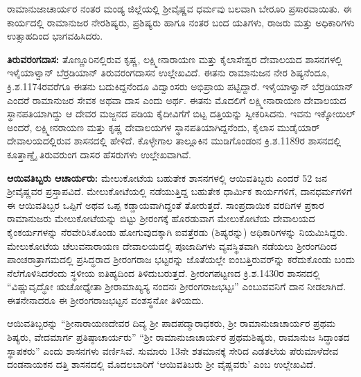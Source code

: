 ರಾಮಾನುಜಾಚಾರ್ಯರ ನಂತರ ಮಂಡ್ಯ ಜಿಲ್ಲೆಯಲ್ಲಿ ಶ‍್ರೀವೈಷ್ಣವ ಧರ್ಮವು ಬಲವಾಗಿ ಬೇರೂರಿ ಪ್ರಸಾರವಾಯಿತು. ಈ ಕಾರ್ಯದಲ್ಲಿ ರಾಮಾನುಜರ ನೇರಶಿಷ್ಯರು, ಪ್ರಶಿಷ್ಯರು ಹಾಗೂ ನಂತರ ಬಂದ ಯತಿಗಳು, ರಾಜರು ಮತ್ತು ಅಧಿಕಾರಿಗಳು ಉತ್ಸಾಹದಿಂದ ಭಾಗವಹಿಸಿದರು.

\textbf{ತಿರುವರಂಗದಾಸ:} ತೊಣ್ಣೂರಿನಲ್ಲಿರುವ ಕೃಷ್ಣ, ಲಕ್ಷ್ಮೀನಾರಾಯಣ ಮತ್ತು ಕೈಲಾಸೇಶ್ವರ ದೇವಾಲಯದ ಶಾಸನಗಳಲ್ಲಿ ಇಳೈಯಾಳ್ವಾನ್​ ಬೆರ್ರಡಿಯಾನ್​ ತಿರುವರಂಗದಾಸನ ಉಲ್ಲೇಖವಿದೆ. ಈತನು ರಾಮಾನುಜನ ನೇರ ಶಿಷ್ಯನೆಂದೂ, ಕ್ರಿ.ಶ.1174ರವರೆಗೂ ಈತನು ಬದುಕಿದ್ದನೆಂದೂ ವಿದ್ವಾಂಸರು ಅಭಿಪ್ರಾಯ ಪಟ್ಟಿದ್ದಾರೆ. ಇಳೈಯಾಳ್ವಾನ್​ ಬೆರ್ರಡಿಯಾನ್​ ಎಂದರೆ ರಾಮಾನುಜರ ಸೇವಕ ಅಥವಾ ದಾಸ ಎಂದು ಅರ್ಥ. ಈತನು ಮೊದಲಿಗೆ ಲಕ್ಷ್ಮೀನಾರಾಯಣ ದೇವಾಲಯದ ಸ್ಥಾನಪತಿಯಾಗಿದ್ದು ಆ ದೇವರ ಮಜ್ಜನದ ಪಡಿಯ ಕೈದೀವಿಗೆಗೆ ಬಿಟ್ಟ ದತ್ತಿಯನ್ನು ಸ್ವೀಕರಿಸಿದನು. ಇವನು ಇಕ್ಕೋಯಿಲ್​ ಅಂದರೆ, ಲಕ್ಷ್ಮೀನರಾಯಣ ಮತ್ತು ಕೃಷ್ಣ ದೇವಾಲಯಗಳ ಸ್ಥಾನಪತಿಯಾಗಿದ್ದನೆಂದು, ಕೈಲಾಸ ಮುಡೈಯಾರ್​ ದೇವಾಲಯದಲ್ಲಿರುವ ಶಾಸನದಲ್ಲಿ ಹೇಳಿದೆ. ಕೊಳ್ಳೇಗಾಲ ತಾಲ್ಲೂಕಿನ ಮುಡಿಗೊಂಡಂನ ಕ್ರಿ.ಶ.1189ರ ಶಾಸನದಲ್ಲಿ ಕೂತ್ತಾಣ್ಡೈ ತಿರುವರುಂಗ ದಾಸರ ಹೆಸರುಗಳು ಉಲ್ಲೇಖವಾಗಿವೆ.

\textbf{ಆಯಿವತಿಬ್ಬರು ಆಚಾರ್ಯರು:} ಮೇಲುಕೋಟೆಯ ಬಹುತೇಕ ಶಾಸನಗಳಲ್ಲಿ ಆಯಿವತಿಬ್ಬರು ಎಂದರೆ 52 ಜನ ಶ‍್ರೀವೈಷ್ಣವರ ಪ್ರಸ್ತಾಪವಿದೆ. ಮೇಲುಕೋಟೆಯಲ್ಲಿ ನಡೆಯುತ್ತಿದ್ದ ಬಹುತೇಕ ಧಾರ್ಮಿಕ ಕಾರ್ಯಗಳಿಗೆ, ದಾನಧರ್ಮಗಳಿಗೆ ಈ ಆಯಿವತಿಬ್ಬರ ಒಪ್ಪಿಗೆ ಅಥವ ಒಪ್ಪ ಕಡ್ಡಾಯವಾಗಿದ್ದಂತೆ ತೋರುತ್ತದೆ. ಸಾಂಪ್ರದಾಯಿಕ ವರದಿಗಳ ಪ್ರಕಾರ ರಾಮಾನುಜರು ಮೇಲುಕೋಟೆಯನ್ನು ಬಿಟ್ಟು ಶ‍್ರೀರಂಗಕ್ಕೆ ಹೊರಡುವಾಗ ಮೇಲುಕೋಟೆಯ ದೇವಾಲಯದ ಕೈಂಕರ್ಯಗಳನ್ನು ನೆರವೇರಿಸಿಕೊಂಡು ಹೋಗುವುದಕ್ಕಾಗಿ ಐವತ್ತೆರಡು (ಶಿಷ್ಯರನ್ನು) ಅಧಿಕಾರಿಗಳನ್ನು ನಿಯಮಿಸಿದ್ದರು. ಮೇಲುಕೋಟೆಯ ಚೆಲುವನಾರಾಯಣ ದೇವಾಲಯದಲ್ಲಿ ಪೂಜಾದಿಗಳು ವ್ಯವಸ್ಥಿತವಾಗಿ ನಡೆಯಲು ಶ‍್ರೀರಂಗದಿಂದ ಪಾಂಚರಾತ್ರಾಗಮದಲ್ಲಿ ಪ್ರಸಿದ್ಧರಾದ ಶ‍್ರೀರಂಗರಾಜ ಭಟ್ಟರನ್ನು ಜೊತೆಯಲ್ಲೇ ಐಂಬತ್ತಿರುವರ್​ನ್ನು ಕರೆದುಕೊಂಡು ಬಂದು ನೆಲೆಗೊಳಿಸಿದರೆಂದು ಸ್ಥಳೀಯ ಐತಿಹ್ಯದಿಂದ ತಿಳಿದುಬರುತ್ತದೆ. ಶ‍್ರೀರಂಗಪಟ್ಟಣದ ಕ್ರಿ.ಶ.1430ರ ಶಾಸನದಲ್ಲಿ “ವಿಷ್ಣುವೃದ್ಧೋ ಋಚೋಧ್ಯೇತಾ ಶ‍್ರೀರಾಮಾಖ್ಯಸ್ಯ ನಂದನಃ ಶ‍್ರೀರಂಗರಾಜಭಟ್ಟಃ” ಎಂಬುವವನಿಗೆ ದಾನ ನೀಡಲಾಗಿದೆ. ಈತನೇನಾದರೂ ಈ ಶ‍್ರೀರಂಗರಾಜಭಟ್ಟನ ವಂಶಸ್ಥನೋ ತಿಳಿಯದು.

ಆಯಿವತಿಬ್ಬರನ್ನು “ಶ‍್ರೀನಾರಾಯಣದೇವರ ದಿವ್ಯ ಶ‍್ರೀ ಪಾದಪದ್ಮಾರಾಧಕರು, ಶ‍್ರೀ ರಾಮಾನುಜಾಚಾರ್ಯರ ಪ್ರಥಮ ಶಿಷ್ಯರು, ವೇದಮಾರ್ಗ ಪ್ರತಿಷ್ಠಾಚಾರ್ಯರು” “ಶ‍್ರೀ ರಾಮಾನುಜಾಚಾರ್ಯರ ಪ್ರಥಮಶಿಷ್ಯರು, ರಾಮಾನುಜ ಸಿದ್ಧಾಂತದ ಸ್ಥಾಪಕರು” ಎಂದು ಶಾಸನಗಳು ವರ್ಣಿಸಿವೆ. ಸುಮಾರು 13ನೇ ಶತಮಾನಕ್ಕೆ ಸೇರಿದ ಎಡತಲೆಯ ಪೆರುಮಾಳೆದೇವ ದಂಡನಾಯಕನ ದತ್ತಿ ಶಾಸನದಲ್ಲಿ ಮೊದಲಬಾರಿಗೆ ‘ಆಯಿವತಿಬರು ಶ‍್ರೀ ವೈಷ್ಣವರು’ ಎಂಬ ಉಲ್ಲೇಖವಿದೆ.

